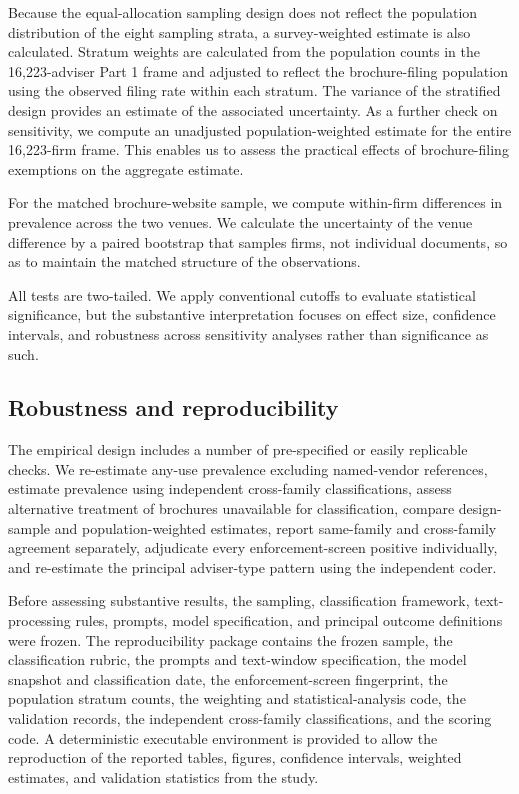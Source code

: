 \documentclass[utf8]{FrontiersinHarvard}
\begin{document}
Because the equal-allocation sampling design does not reflect the population distribution of the eight sampling strata, a survey-weighted estimate is also calculated. Stratum weights are calculated from the population counts in the 16{,}223-adviser Part 1 frame and adjusted to reflect the brochure-filing population using the observed filing rate within each stratum. The variance of the stratified design provides an estimate of the associated uncertainty. As a further check on sensitivity, we compute an unadjusted population-weighted estimate for the entire 16{,}223-firm frame. This enables us to assess the practical effects of brochure-filing exemptions on the aggregate estimate.

For the matched brochure-website sample, we compute within-firm differences in prevalence across the two venues. We calculate the uncertainty of the venue difference by a paired bootstrap that samples firms, not individual documents, so as to maintain the matched structure of the observations.

All tests are two-tailed. We apply conventional cutoffs to evaluate statistical significance, but the substantive interpretation focuses on effect size, confidence intervals, and robustness across sensitivity analyses rather than significance as such.

\subsection{Robustness and reproducibility}

The empirical design includes a number of pre-specified or easily replicable checks. We re-estimate any-use prevalence excluding named-vendor references, estimate prevalence using independent cross-family classifications, assess alternative treatment of brochures unavailable for classification, compare design-sample and population-weighted estimates, report same-family and cross-family agreement separately, adjudicate every enforcement-screen positive individually, and re-estimate the principal adviser-type pattern using the independent coder.

Before assessing substantive results, the sampling, classification framework, text-processing rules, prompts, model specification, and principal outcome definitions were frozen. The reproducibility package contains the frozen sample, the classification rubric, the prompts and text-window specification, the model snapshot and classification date, the enforcement-screen fingerprint, the population stratum counts, the weighting and statistical-analysis code, the validation records, the independent cross-family classifications, and the scoring code. A deterministic executable environment is provided to allow the reproduction of the reported tables, figures, confidence intervals, weighted estimates, and validation statistics from the study.
\end{document}
